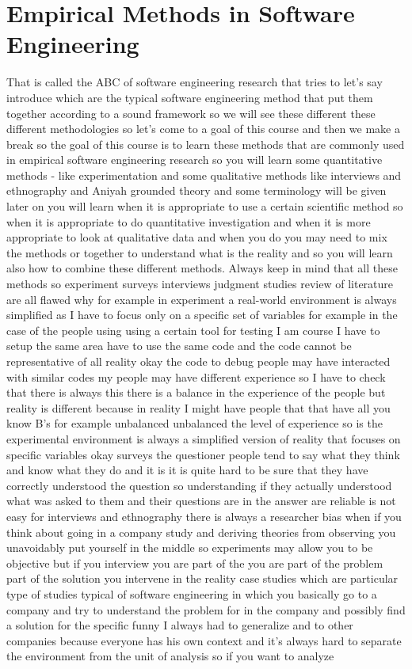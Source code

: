 \documentclass[conference, compsoc, twoside]{IEEEtran}
\begin{document}

\section{Empirical Methods in Software Engineering}
That is called the ABC of software engineering research that tries to let's say introduce which are the typical software engineering method that put them together according to a sound framework so we will see these different these different methodologies so let's come to a goal of this course and then we make a break so the goal of this course is to learn these methods that are commonly used in empirical software engineering research so you will learn some quantitative methods - like experimentation and some qualitative methods like interviews and ethnography and Aniyah grounded theory and some terminology will be given later on you will learn when it is appropriate to use a certain scientific method so when it is appropriate to do quantitative investigation and when it is more appropriate to look at qualitative data and when you do you may need to mix the methods or together to understand what is the reality and so you will learn also how to combine these different methods. 
Always keep in mind that all these methods so experiment surveys interviews judgment studies review of literature are all flawed why 
for example in experiment a real-world environment is always simplified as I have to focus only on a specific set of variables 
for example in the case of the people using using a certain tool for testing I am course I have to setup the same area have to use the same code and the code cannot be representative of all reality okay the code to debug people may have interacted with similar codes my people may have different experience 
so I have to check that there is always this there is a balance in the experience of the people but reality is different because in reality I might have people that that have all you know B's 
for example unbalanced unbalanced the level of experience so is the experimental environment is always a simplified version of reality that focuses on specific variables okay surveys the questioner people tend to say what they think and know what they do and it is it is quite hard to be sure that they have correctly understood the question so understanding if they actually understood what was asked to them and their questions are in the answer are reliable is not easy for interviews and ethnography there is always a researcher bias when if you think about going in a company study and deriving theories from observing you unavoidably put yourself in the middle so experiments may allow you to be objective but if you interview you are part of the you are part of the problem part of the solution you intervene in the reality case studies which are particular type of studies typical of software engineering in which you basically go to a company and try to understand the problem for in the company and possibly find a solution for the specific funny I always had to generalize and to other companies because everyone has his own context and it's always hard to separate the environment from the unit of analysis so if you want to analyze 
\end{document}
